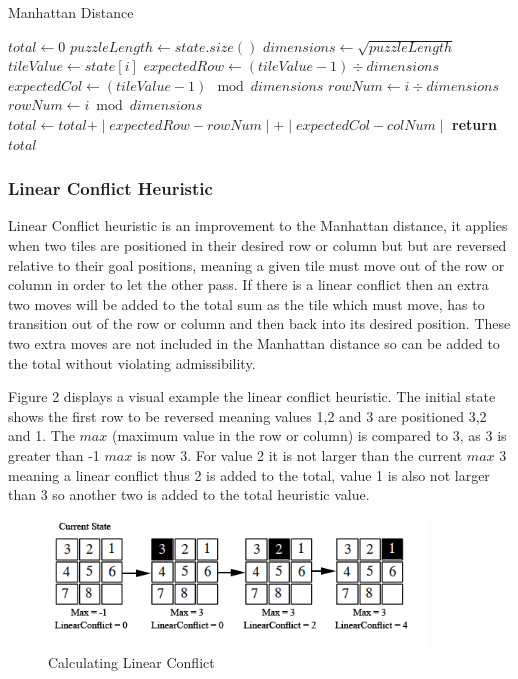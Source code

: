 \documentclass[final]{cmpreport}
\begin{document}
	
\begin{algorithm}
	\caption{Manhattan Distance}\label{Manhattan Distance}
	\begin{algorithmic}[1]
			
		\State$total\gets 0$
		\State$puzzleLength\gets state.size()$
		\State$dimensions\gets \sqrt{puzzleLength}$
			
		\State $tileValue\gets state[i]$
		\State $expectedRow\gets (tileValue -1)\div dimensions$
		\State $expectedCol\gets (tileValue -1)\mod dimensions$
		\State $rowNum \gets i\div dimensions$
		\State $rowNum\gets i \bmod dimensions$
		\State $total\gets total \texttt{+} \mid{expectedRow-rowNum}\mid\texttt{+}\mid{expectedCol-colNum}\mid$
		\EndFor
		\State \textbf{return} $total$
		\EndProcedure
	\end{algorithmic}
\end{algorithm}



\subsubsection{Linear Conflict Heuristic}
Linear Conflict heuristic is an improvement to the Manhattan distance, it applies when two tiles are positioned in their desired row or column but but are reversed relative to
their goal positions, meaning a given tile must move out of the row or column in order to let the other pass. If there is a linear conflict then an extra two moves will be added to the total sum as the tile which must move, has to transition out of the row or column and then back into its desired position. These two extra moves are not included in the Manhattan distance so can be added to the total without violating admissibility.



Figure 2 displays a visual example the linear conflict heuristic. The initial state shows the first row to be reversed meaning values 1,2 and 3 are positioned 3,2 and 1. The $max$ (maximum value in the row or column) is compared to 3, as 3 is greater than -1 $max$ is now 3. For value 2 it is not larger than the current $max$ 3 meaning a linear conflict thus 2 is added to the total, value 1 is also not larger than 3 so another two is added to the total heuristic value.


\begin{figure}[ht]
	\centering
	\includegraphics[width=0.9\textwidth]{linear}
	\captionsetup{justification=centering}
	\caption{Calculating Linear Conflict}
\end{figure}
\end{document}
